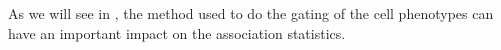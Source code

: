 As we will see in , the method used to do the gating of the cell phenotypes can have an important impact on the association
statistics.





%
%
%
%
%


%
